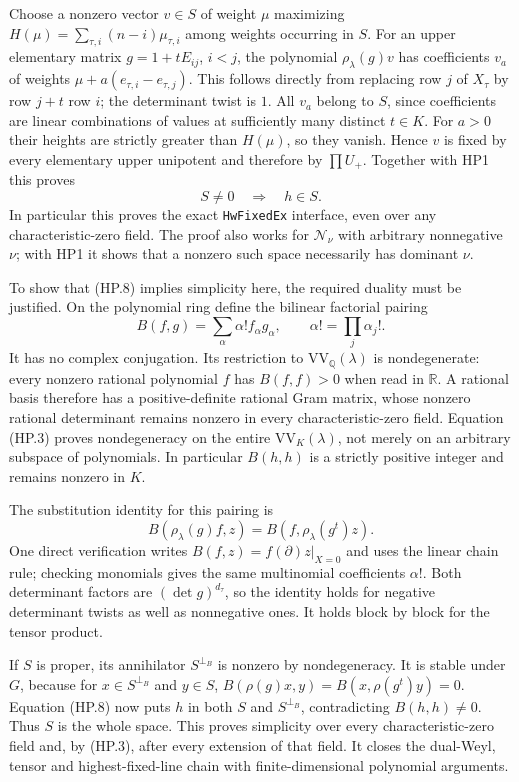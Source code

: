 Choose a nonzero vector $v\in S$ of weight $\mu$ maximizing
$H(\mu)=\sum_{\tau,i}(n-i)\mu_{\tau,i}$ among weights occurring in $S$.
For an upper elementary matrix $g=1+tE_{ij}$, $i<j$, the polynomial
$\rho_\lambda(g)v$ has coefficients $v_a$ of weights
$\mu+a(e_{\tau,i}-e_{\tau,j})$.  This follows directly from replacing
row $j$ of $X_\tau$ by row $j+t$ row $i$; the determinant twist is $1$.
All $v_a$ belong to $S$, since coefficients are linear combinations of
values at sufficiently many distinct $t\in K$.  For $a>0$ their heights
are strictly greater than $H(\mu)$, so they vanish.  Hence $v$ is fixed
by every elementary upper unipotent and therefore by $\prod U_+$.
Together with HP1 this proves
\[
             S\ne0\quad\Longrightarrow\quad h\in S.
 \tag{HP.8}
\]
In particular this proves the exact \texttt{HwFixedEx} interface,
even over any characteristic-zero field.  The proof also works for
$\mathcal N_\nu$ with arbitrary nonnegative $\nu$; with HP1 it shows
that a nonzero such space necessarily has dominant $\nu$.

To show that (HP.8) implies simplicity here, the required duality
must be justified.  On the polynomial ring define the bilinear
factorial pairing
\[
        B(f,g)=\sum_\alpha \alpha! f_\alpha g_\alpha,
       \qquad \alpha!=\prod_j\alpha_j! .             \tag{HP.9}
\]
It has no complex conjugation.  Its restriction to
$\mathrm{VV}_{\mathbb Q}(\lambda)$ is nondegenerate: every nonzero
rational polynomial $f$ has $B(f,f)>0$ when read in $\mathbb R$.
A rational basis therefore has a positive-definite rational Gram
matrix, whose nonzero rational determinant remains nonzero in every
characteristic-zero field.  Equation (HP.3) proves nondegeneracy on
the entire $\mathrm{VV}_K(\lambda)$, not merely on an arbitrary
subspace of polynomials.  In particular $B(h,h)$ is a strictly
positive integer and remains nonzero in $K$.

The substitution identity for this pairing is
\[
              B(\rho_\lambda(g)f,z)
                       =B(f,\rho_\lambda(g^t)z).     \tag{HP.10}
\]
One direct verification writes
$B(f,z)=f(\partial)z|_{X=0}$ and uses the linear chain rule; checking
monomials gives the same multinomial coefficients $\alpha!$.
Both determinant factors are $(\det g)^{d_\tau}$, so the identity
holds for negative determinant twists as well as nonnegative ones.
It holds block by block for the tensor product.

If $S$ is proper, its annihilator $S^{\perp_B}$ is nonzero by
nondegeneracy.  It is stable under $G$, because for $x\in S^{\perp_B}$
and $y\in S$,
$B(\rho(g)x,y)=B(x,\rho(g^t)y)=0$.
Equation (HP.8) now puts $h$ in both $S$ and $S^{\perp_B}$,
contradicting $B(h,h)\ne0$.  Thus $S$ is the whole space.  This proves
simplicity over every characteristic-zero field and, by (HP.3), after
every extension of that field.  It closes the dual-Weyl, tensor and
highest-fixed-line chain with finite-dimensional polynomial arguments.

